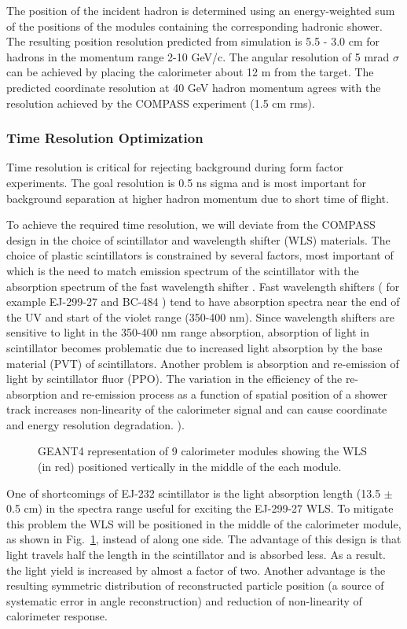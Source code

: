 \documentclass[11pt]{article}
\begin{document}
{The position of the incident hadron is determined  using an energy-weighted sum of the positions of the 
modules containing the corresponding hadronic shower.
The resulting position resolution predicted from simulation is 5.5 - 3.0 cm for hadrons in the momentum range 2-10 GeV/c.  The angular resolution of 5 mrad  $\sigma$ can be achieved by placing the calorimeter about 12 m from the target.  The predicted coordinate resolution at 40 GeV hadron momentum agrees with the resolution achieved by the COMPASS experiment (1.5 cm rms). 

\subsubsection{Time Resolution Optimization}
Time resolution is critical for rejecting background during form factor experiments. 
The goal resolution is 0.5 ns sigma and is most important for background separation at higher 
hadron momentum due to short time of flight.

To achieve the required time resolution, we will deviate from the COMPASS design in the choice of scintillator and wavelength shifter (WLS) materials.
The choice of plastic scintillators is constrained by several factors, most important of which is 
the need to match emission spectrum of the scintillator with the absorption spectrum of the fast wavelength shifter .
Fast wavelength shifters ( for example EJ-299-27 and BC-484 ) tend to have absorption spectra
near the end of the UV and start of the violet range (350-400 nm). Since wavelength shifters are sensitive to light 
in the 350-400 nm range absorption, absorption of light in scintillator becomes problematic due to increased light 
absorption by the base material (PVT) of scintillators.  Another problem is absorption and re-emission of light by scintillator fluor (PPO).
The variation in the efficiency of the re-absorption and re-emission process as a function
of spatial position of a shower track
increases non-linearity of the calorimeter signal and can cause coordinate and energy resolution degradation. 
).  
\begin{figure}[ht]
\centerline{
}
\caption{ GEANT4 representation of 9 calorimeter modules showing the WLS (in red) positioned vertically in the middle of the each module. }
\label{fig:MODULE}
\end{figure}


One of shortcomings of EJ-232 scintillator is the light absorption length (13.5 $\pm$ 0.5 cm) 
in the spectra range useful for exciting the EJ-299-27 WLS. To mitigate this problem 
the WLS will be positioned in the middle of the calorimeter module, as shown in Fig.~\ref{fig:MODULE}, instead of along one side.
The advantage of this design is that light travels half the length in the scintillator 
and is absorbed less. As a result. the light yield is increased by almost a factor of two. Another advantage is 
the resulting symmetric distribution of reconstructed particle position (a source of systematic error in angle reconstruction) 
and reduction of non-linearity of calorimeter response. 

}
\end{document}
